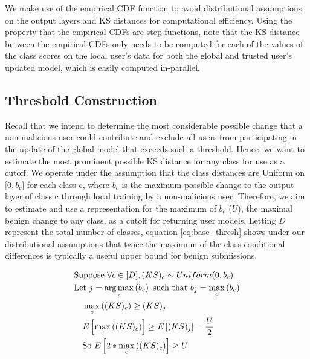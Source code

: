 \documentclass{article} %
\begin{document}
We make use of the empirical CDF function to avoid distributional assumptions on the output layers and KS distances for computational efficiency. Using the property that the empirical CDFs are step functions, note that the KS distance between the empirical CDFs only needs to be computed for each of the values of the class scores on the local user's data for both the global and trusted user's updated model, which is easily computed in-parallel.

%
\subsection{Threshold Construction}

Recall that we intend to determine the most considerable possible change that a non-malicious user could contribute and exclude all users from participating in the update of the global model that exceeds such a threshold. Hence, we want to estimate the most prominent possible KS distance for any class for use as a cutoff. We operate under the assumption that the class distances are Uniform on $\mathopen[0, b_c\mathclose]$ for each class c, where $b_c$ is the maximum possible change to the output layer of class c through local training by a non-malicious user. Therefore, we aim to estimate and use a representation for the maximum of $b_c$ ($U$), the maximal benign change to any class, as a cutoff for returning user models. Letting $D$ represent the total number of classes, equation \ref{eq:base_thresh} shows under our distributional assumptions that twice the maximum of the class conditional differences is typically a useful upper bound for benign submissions.

\begin{align}
    & \textrm{Suppose } \forall c \in \mathopen[ D \mathclose], (KS)_c \sim Uniform(0, b_c) \nonumber \\
    & \textrm{Let } j = \operatorname*{arg\,max}_c \left( b_c \right) \textrm{ such that } b_j = \max_c \left( b_c \right) \nonumber \\
    & \quad \max_c \left( (KS)_c \right) \geq (KS)_j \nonumber \\
    & \quad E \left[ \max_c \left( (KS)_c \right) \right] \geq E \left[ (KS)_j \right] = \dfrac{U}{2} \nonumber \\
    & \quad \textrm{So } E \left[ 2 * \max_c \left( (KS)_c \right) \right] \geq U \label{eq:base_thresh} 
\end{align}
\end{document}
